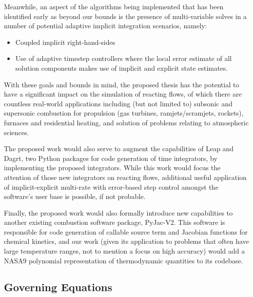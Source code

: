 Meanwhile, an aspect of the algorithms being implemented that has been identified
early as beyond our bounds is the presence of multi-variable solves in a number of
potential adaptive implicit integration scenarios, namely:
\begin{itemize}
\item{Coupled implicit right-hand-sides}
\item{Use of adaptive timestep controllers where the local error estimate
      of all solution components makes use of implicit and explicit state
      estimates.}
\end{itemize}

With these goals and bounds in mind, the proposed thesis has the potential to
have a significant impact on the simulation of reacting flows, of which there
are countless real-world applications including (but not limited to) subsonic
and supersonic combustion for propulsion (gas turbines, ramjets/scramjets,
rockets), furnaces and residential heating, and solution of problems relating
to atmospheric sciences.

The proposed work would also serve to augment the capabilities of Leap and Dagrt,
two Python packages for code generation of time integrators, by implementing the
proposed integrators. While this work would focus the attention of those new
integrators on reacting flows, additional useful application of implicit-explicit
multi-rate with error-based step control amongst the software's user base is
possible, if not probable.

Finally, the proposed work would also formally introduce new capabilities
to another existing combustion software package, PyJac-V2. This software is
responsible for code generation of callable source term and Jacobian functions
for chemical kinetics, and our work (given its application to problems that
often have large temperature ranges, not to mention a focus on high accuracy)
would add a NASA9 polynomial representation of thermodynamic quantities to
its codebase.

\subsection{Governing Equations}

